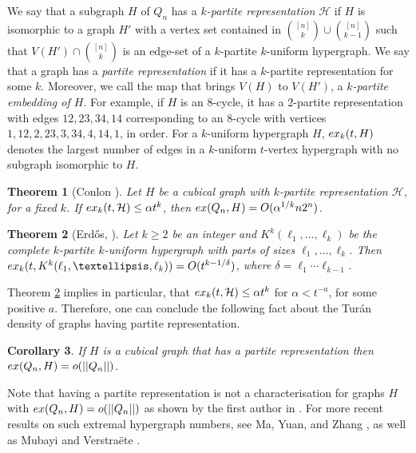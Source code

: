 \documentclass[11pt, a4paper]{article}
\newtheorem{theorem}{Theorem}
\newtheorem{corollary}[theorem]{Corollary}
\newcommand{\cH}{\mathcal{H}}
\newcommand{\ex}{{\rm  ex}}
\begin{document}
	
	We say that a subgraph $H$ of $Q_n$ has  a {\it $k$-partite representation}  $\cH$  if $H$ is isomorphic to a graph $H'$ with a vertex set contained in  $\binom{[n]}{k}\cup \binom{[n]}{k-1}$ such that   $V(H') \cap \binom{[n]}{k}$ is an edge-set of a $k$-partite $k$-uniform hypergraph.  We say that a graph has a {\it partite representation} if it has a $k$-partite representation for some $k$.
	Moreover, we call the map that brings $V(H)$ to  $V(H')$, a {\it $k$-partite embedding of $H$}.
	For example, if $H$ is an $8$-cycle, it has a $2$-partite representation with edges 
$12, 23, 34, 14$ corresponding to an $8$-cycle  with vertices $1, 12, 2, 23, 3, 34, 4, 14, 1$, in order. 
For a $k$-uniform hypergraph $H$, $\ex_k(t, H)$ denotes the largest number of edges in a $k$-uniform $t$-vertex hypergraph with no subgraph isomorphic to $H$.




\begin{theorem} [Conlon \cite{C}]\label{Conlon-rep-exponent}
Let $H$ be a cubical graph with $k$-partite representation $\cH$, for a fixed $k$.  If $\ex_k(t, \cH) \leq \alpha t^k$, then $\ex(Q_n, H) = O(\alpha^{1/k}n2^n)$. 
\end{theorem}


\begin{theorem}[Erd\H{o}s, \cite{E64}] \label{Erdos}
Let $k\geq 2$ be an integer and $K^{k}(\ell_1, \ldots, \ell_k)$ be the complete $k$-partite $k$-uniform hypergraph with parts of sizes $\ell_1, \ldots, \ell_k$.
Then $\ex_{k}(t, K^{k}(\ell_1, \ldots, \ell_{k})) = O(t^{k - 1/\delta})$, 
where  $\delta = \ell_1 \cdots \ell_{k-1}$. 
\end{theorem}

Theorem \ref{Erdos}
implies in particular, that  $\ex_k(t, \cH) \leq \alpha t^k$  for  $\alpha < t^{-a}$, for some positive $a$. Therefore, one can conclude the following fact about the Tur\'an density of graphs having partite representation.

\begin{corollary} 
If $H$ is a cubical graph  that has a  partite representation then $\ex(Q_n, H)= o(||Q_n||)$.
\end{corollary}

Note that having a partite representation is not a characterisation for graphs $H$ with $\ex(Q_n, H)= o(||Q_n||)$ as shown by the first author in \cite{MA1}.
For more recent results on such extremal hypergraph numbers, see Ma, Yuan, and  Zhang  \cite{MYZ}, as well as Mubayi and Verstra\"ete \cite{MV}.
\end{document}
